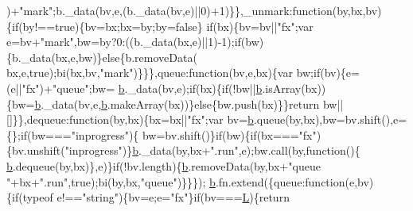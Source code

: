 \begin{DoxyCode}
      )+\textcolor{stringliteral}{"mark"};b.\_data(bv,e,(b.\_data(bv,e)||0)+1)\}\},\_unmark:\textcolor{keyword}{function}(by,bx,bv)\{if(by!==true)\{bv=bx;bx=by;by=false\}\textcolor{keywordflow}{
      if}(bx)\{bv=bv||\textcolor{stringliteral}{"fx"};var e=bv+\textcolor{stringliteral}{"mark"},bw=by?0:((b.\_data(bx,e)||1)-1);if(bw)\{b.\_data(bx,e,bw)\}\textcolor{keywordflow}{else}\{b.removeData(
      bx,e,true);bi(bx,bv,\textcolor{stringliteral}{"mark"})\}\}\},queue:\textcolor{keyword}{function}(bv,e,bx)\{var bw;\textcolor{keywordflow}{if}(bv)\{e=(e||\textcolor{stringliteral}{"fx"})+\textcolor{stringliteral}{"queue"};bw=
      \hyperlink{docs_2_programmer's_manual_2html_2jquery_8js_aa4026ad5544b958e54ce5e106fa1c805}{b}.\_data(bv,e);\textcolor{keywordflow}{if}(bx)\{\textcolor{keywordflow}{if}(!bw||\hyperlink{docs_2_programmer's_manual_2html_2jquery_8js_aa4026ad5544b958e54ce5e106fa1c805}{b}.isArray(bx))\{bw=\hyperlink{docs_2_programmer's_manual_2html_2jquery_8js_aa4026ad5544b958e54ce5e106fa1c805}{b}.\_data(bv,e,\hyperlink{docs_2_programmer's_manual_2html_2jquery_8js_aa4026ad5544b958e54ce5e106fa1c805}{b}.makeArray(bx))\}\textcolor{keywordflow}{else}\{bw.push(bx)\}\}\textcolor{keywordflow}{return} 
      bw||[]\}\},dequeue:\textcolor{keyword}{function}(by,bx)\{bx=bx||\textcolor{stringliteral}{"fx"};var bv=\hyperlink{docs_2_programmer's_manual_2html_2jquery_8js_aa4026ad5544b958e54ce5e106fa1c805}{b}.queue(by,bx),bw=bv.shift(),e=\{\};\textcolor{keywordflow}{if}(bw===\textcolor{stringliteral}{"inprogress"})\{
      bw=bv.shift()\}\textcolor{keywordflow}{if}(bw)\{\textcolor{keywordflow}{if}(bx===\textcolor{stringliteral}{"fx"})\{bv.unshift(\textcolor{stringliteral}{"inprogress"})\}\hyperlink{docs_2_programmer's_manual_2html_2jquery_8js_aa4026ad5544b958e54ce5e106fa1c805}{b}.\_data(by,bx+\textcolor{stringliteral}{".run"},e);bw.call(by,\textcolor{keyword}{function}()\{
      \hyperlink{docs_2_programmer's_manual_2html_2jquery_8js_aa4026ad5544b958e54ce5e106fa1c805}{b}.dequeue(by,bx)\},e)\}\textcolor{keywordflow}{if}(!bv.length)\{\hyperlink{docs_2_programmer's_manual_2html_2jquery_8js_aa4026ad5544b958e54ce5e106fa1c805}{b}.removeData(by,bx+\textcolor{stringliteral}{"queue "}+bx+\textcolor{stringliteral}{".run"},\textcolor{keyword}{true});bi(by,bx,\textcolor{stringliteral}{"queue"})\}\}\});
      \hyperlink{docs_2_programmer's_manual_2html_2jquery_8js_aa4026ad5544b958e54ce5e106fa1c805}{b}.fn.extend(\{queue:\textcolor{keyword}{function}(e,bv)\{\textcolor{keywordflow}{if}(typeof e!==\textcolor{stringliteral}{"string"})\{bv=e;e=\textcolor{stringliteral}{"fx"}\}\textcolor{keywordflow}{if}(bv===\hyperlink{docs_2_programmer's_manual_2html_2jquery_8js_a38ee4c0b5f4fe2a18d0c783af540d253}{L})\{\textcolor{keywordflow}{return} 

\end{DoxyCode}
